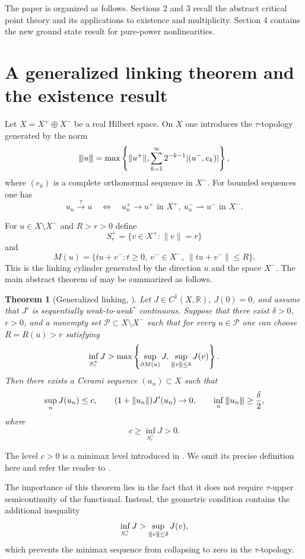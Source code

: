 \documentclass[11pt]{amsart}
\numberwithin{equation}{section}
\newtheorem{theorem}{Theorem}[section]
\theoremstyle{definition}
\newcommand{\R}{\mathbb{R}}
\newcommand{\cP}{\mathcal{P}}
\newcommand{\weak}{\rightharpoonup}
\newcommand{\vertiii}[1]{{\left\vert\kern-0.25ex\left\vert\kern-0.25ex\left\vert #1 \right\vert\kern-0.25ex\right\vert\kern-0.25ex\right\vert}}
\begin{document}
The paper is organized as follows. Sections 2 and 3 recall the abstract critical point theory and its applications to existence and multiplicity. Section 4 contains the new ground state result for pure-power nonlinearities.


\section{A generalized linking theorem and the existence result}

Let $X=X^+\oplus X^-$ be a real Hilbert space. On $X$ one introduces the
$\tau$-topology generated by the norm
\[
\vertiii{u}=\max\left\{
\|u^+\|,
\sum_{k=1}^\infty 2^{-k-1}|(u^-,e_k)|
\right\},
\]
where $(e_k)$ is a complete orthonormal sequence in $X^-$. For bounded
sequences one has
\[
u_n\xrightarrow{\tau}u
\quad\Longleftrightarrow\quad
u_n^+\to u^+ \text{ in }X^+,\ u_n^-\weak u^- \text{ in }X^-.
\]

For $u\in X\setminus X^-$ and $R>r>0$ define
\[
S_r^+=\{v\in X^+:\|v\|=r\}
\]
and
\[
M(u)=\{tu+v^-:t\ge0,\ v^-\in X^-,\ \|tu+v^-\|\le R\}.
\]
This is the linking cylinder generated by the direction $u$ and the space $X^-$. The main abstract theorem of \cite{BB2022} may be summarized as follows.

\begin{theorem}[Generalized linking, {\cite[Theorem 2.1]{BB2022}}]
Let $J\in C^1(X,\R)$, $J(0)=0$, and assume that $J'$ is sequentially
weak-to-weak$^*$ continuous. Suppose that there exist $\delta>0$, $r>0$,
and a nonempty set $\cP\subset X\setminus X^-$ such that for every
$u\in\cP$ one can choose $R=R(u)>r$ satisfying
\[
\inf_{S_r^+}J>
\max\left\{
\sup_{\partial M(u)}J,\,
\sup_{\vertiii{v}\le\delta}J(v)
\right\}.
\]
Then there exists a Cerami sequence $(u_n)\subset X$ such that
\[
\sup_n J(u_n)\le c,\qquad
(1+\|u_n\|)J'(u_n)\to0,
\qquad
\inf_n \vertiii{u_n}\ge\frac{\delta}{2},
\]
where
\[
c\ge \inf_{S_r^+}J>0.
\]
\end{theorem}

The level $c>0$ is a minimax level introduced in \cite{BB2022}. We omit its precise definition here and refer the reader to \cite{BB2022}.


The importance of this theorem lies in the fact that it does not require
$\tau$-upper semicontinuity of the functional. Instead, the geometric
condition contains the additional inequality
\[
\inf_{S_r^+}J>\sup_{\vertiii{v}\le\delta}J(v),
\]
which prevents the minimax sequence from collapsing to zero in the
$\tau$-topology.
\end{document}
